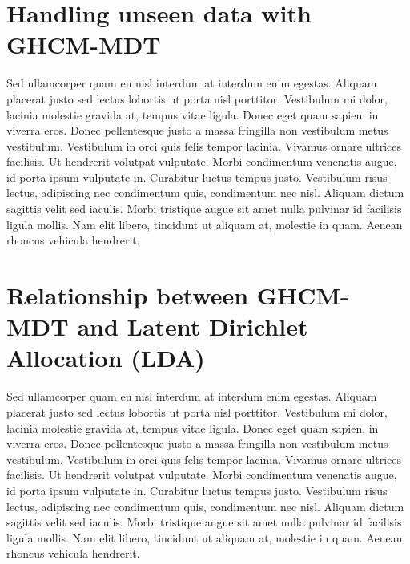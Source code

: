 
\section{Handling unseen data with GHCM-MDT}

Sed ullamcorper quam eu nisl interdum at interdum enim egestas. Aliquam placerat justo sed lectus lobortis ut porta nisl porttitor. Vestibulum mi dolor, lacinia molestie gravida at, tempus vitae ligula. Donec eget quam sapien, in viverra eros. Donec pellentesque justo a massa fringilla non vestibulum metus vestibulum. Vestibulum in orci quis felis tempor lacinia. Vivamus ornare ultrices facilisis. Ut hendrerit volutpat vulputate. Morbi condimentum venenatis augue, id porta ipsum vulputate in. Curabitur luctus tempus justo. Vestibulum risus lectus, adipiscing nec condimentum quis, condimentum nec nisl. Aliquam dictum sagittis velit sed iaculis. Morbi tristique augue sit amet nulla pulvinar id facilisis ligula mollis. Nam elit libero, tincidunt ut aliquam at, molestie in quam. Aenean rhoncus vehicula hendrerit.




\section{Relationship between GHCM-MDT and Latent Dirichlet Allocation (LDA)}

Sed ullamcorper quam eu nisl interdum at interdum enim egestas. Aliquam placerat justo sed lectus lobortis ut porta nisl porttitor. Vestibulum mi dolor, lacinia molestie gravida at, tempus vitae ligula. Donec eget quam sapien, in viverra eros. Donec pellentesque justo a massa fringilla non vestibulum metus vestibulum. Vestibulum in orci quis felis tempor lacinia. Vivamus ornare ultrices facilisis. Ut hendrerit volutpat vulputate. Morbi condimentum venenatis augue, id porta ipsum vulputate in. Curabitur luctus tempus justo. Vestibulum risus lectus, adipiscing nec condimentum quis, condimentum nec nisl. Aliquam dictum sagittis velit sed iaculis. Morbi tristique augue sit amet nulla pulvinar id facilisis ligula mollis. Nam elit libero, tincidunt ut aliquam at, molestie in quam. Aenean rhoncus vehicula hendrerit.


